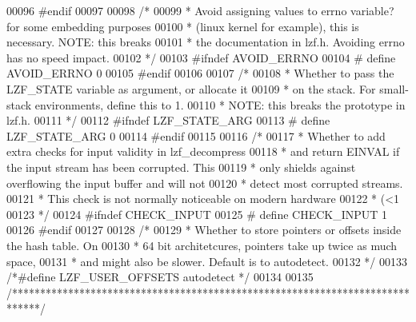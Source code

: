 \begin{DoxyCode}
{{{00096 \textcolor{preprocessor}{#}\textcolor{preprocessor}{endif}
00097 
00098 \textcolor{comment}{/*}
00099 \textcolor{comment}{ * Avoid assigning values to errno variable? for some embedding purposes}
00100 \textcolor{comment}{ * (linux kernel for example), this is necessary. NOTE: this breaks}
00101 \textcolor{comment}{ * the documentation in lzf.h. Avoiding errno has no speed impact.}
00102 \textcolor{comment}{ */}
00103 \textcolor{preprocessor}{#}\textcolor{preprocessor}{ifndef} \textcolor{preprocessor}{AVOID\_ERRNO}
00104 \textcolor{preprocessor}{#} \textcolor{preprocessor}{define} \textcolor{preprocessor}{AVOID\_ERRNO} 0
00105 \textcolor{preprocessor}{#}\textcolor{preprocessor}{endif}
00106 
00107 \textcolor{comment}{/*}
00108 \textcolor{comment}{ * Whether to pass the LZF\_STATE variable as argument, or allocate it}
00109 \textcolor{comment}{ * on the stack. For small-stack environments, define this to 1.}
00110 \textcolor{comment}{ * NOTE: this breaks the prototype in lzf.h.}
00111 \textcolor{comment}{ */}
00112 \textcolor{preprocessor}{#}\textcolor{preprocessor}{ifndef} \textcolor{preprocessor}{LZF\_STATE\_ARG}
00113 \textcolor{preprocessor}{#} \textcolor{preprocessor}{define} \textcolor{preprocessor}{LZF\_STATE\_ARG} 0
00114 \textcolor{preprocessor}{#}\textcolor{preprocessor}{endif}
00115 
00116 \textcolor{comment}{/*}
00117 \textcolor{comment}{ * Whether to add extra checks for input validity in lzf\_decompress}
00118 \textcolor{comment}{ * and return EINVAL if the input stream has been corrupted. This}
00119 \textcolor{comment}{ * only shields against overflowing the input buffer and will not}
00120 \textcolor{comment}{ * detect most corrupted streams.}
00121 \textcolor{comment}{ * This check is not normally noticeable on modern hardware}
00122 \textcolor{comment}{ * (<1%
00123 \textcolor{comment}{ */}
00124 \textcolor{preprocessor}{#}\textcolor{preprocessor}{ifndef} \textcolor{preprocessor}{CHECK\_INPUT}
00125 \textcolor{preprocessor}{#} \textcolor{preprocessor}{define} \textcolor{preprocessor}{CHECK\_INPUT} 1
00126 \textcolor{preprocessor}{#}\textcolor{preprocessor}{endif}
00127 
00128 \textcolor{comment}{/*}
00129 \textcolor{comment}{ * Whether to store pointers or offsets inside the hash table. On}
00130 \textcolor{comment}{ * 64 bit architetcures, pointers take up twice as much space,}
00131 \textcolor{comment}{ * and might also be slower. Default is to autodetect.}
00132 \textcolor{comment}{ */}
00133 \textcolor{comment}{/*#define LZF\_USER\_OFFSETS autodetect */}
00134 
00135 \textcolor{comment}{/*****************************************************************************/}
}}}}
\end{DoxyCode}
